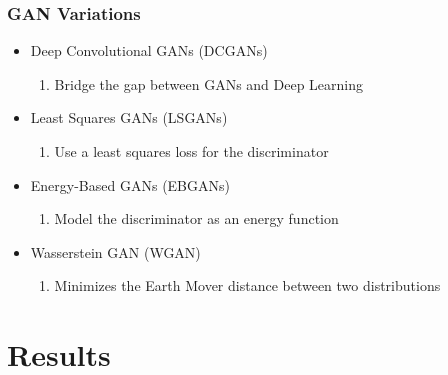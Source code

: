 \documentclass{beamer}
\begin{document}
\begin{frame}
\frametitle{\textbf{GAN Variations}}
   \begin{itemize}
      \item Deep Convolutional GANs (DCGANs)
	   \begin{enumerate}[$-$]
         \item Bridge the gap between GANs and Deep Learning
      \end{enumerate}
      \item Least Squares GANs (LSGANs)
	   \begin{enumerate}[$-$]
         \item Use a least squares loss for the discriminator
      \end{enumerate}
      \item Energy-Based GANs (EBGANs)
	   \begin{enumerate}[$-$]
         \item Model the discriminator as an energy function
      \end{enumerate}
      \item Wasserstein GAN (WGAN)
	   \begin{enumerate}[$-$]
         \item Minimizes the Earth Mover distance between two distributions
      \end{enumerate}
   \end{itemize}
\end{frame}


\section*{Results}




\end{document}
